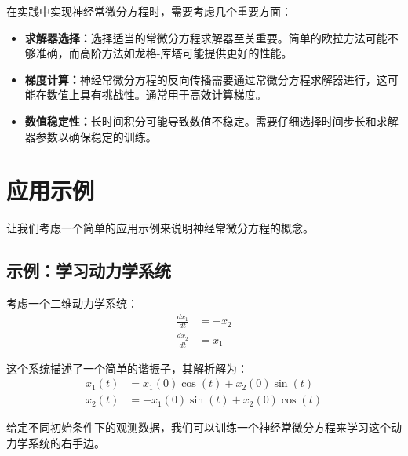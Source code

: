在实践中实现神经常微分方程时，需要考虑几个重要方面：

\begin{itemize}
\item \textbf{求解器选择：}选择适当的常微分方程求解器至关重要。简单的欧拉方法可能不够准确，而高阶方法如龙格-库塔可能提供更好的性能。

\item \textbf{梯度计算：}神经常微分方程的反向传播需要通过常微分方程求解器进行，这可能在数值上具有挑战性。通常用于高效计算梯度。

\item \textbf{数值稳定性：}长时间积分可能导致数值不稳定。需要仔细选择时间步长和求解器参数以确保稳定的训练。
\end{itemize}

\section{应用示例}
\label{sec:applications}

让我们考虑一个简单的应用示例来说明神经常微分方程的概念。

\subsection{示例：学习动力学系统}
\label{subsec:example_dynamical_system}

考虑一个二维动力学系统：
\begin{align}
\frac{dx_1}{dt} &= -x_2 \\
\frac{dx_2}{dt} &= x_1
\end{align}

这个系统描述了一个简单的谐振子，其解析解为：
\begin{align}
x_1(t) &= x_1(0)\cos(t) + x_2(0)\sin(t) \\
x_2(t) &= -x_1(0)\sin(t) + x_2(0)\cos(t)
\end{align}

给定不同初始条件下的观测数据，我们可以训练一个神经常微分方程来学习这个动力学系统的右手边。

